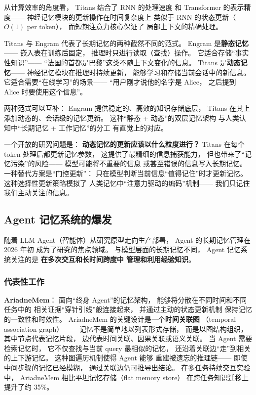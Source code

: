 从计算效率的角度看，
Titans 结合了 RNN 的处理速度
和 Transformer 的表示精度——
神经记忆模块的更新操作在时间复杂度上
类似于 RNN 的状态更新（$O(1)$ per token），
而短期注意力核心保证了
局部上下文的精确处理。

Titans 与 Engram 代表了长期记忆的两种截然不同的范式。
Engram 是\textbf{静态记忆}——
嵌入表在训练后固定，
推理时只进行读取（查找）操作。
它适合存储“事实性知识”——
“法国的首都是巴黎”这类不随上下文变化的信息。
Titans 是\textbf{动态记忆}——
神经记忆模块在推理时持续更新，
能够学习和存储当前会话中的新信息。
它适合需要“在线学习”的场景——
“用户刚才说他的名字是 Alice，
之后提到 Alice 时要使用这个信息”。

两种范式可以互补：
Engram 提供稳定的、高效的知识存储底层，
Titans 在其上添加动态的、会话级的记忆更新。
这种“静态 + 动态”的双层记忆架构
与人类认知中“长期记忆 + 工作记忆”的分工
有直觉上的对应。

一个开放的研究问题是：
\textbf{动态记忆的更新应该以什么粒度进行？}
Titans 在每个 token 处理后都更新记忆参数，
这提供了最精细的信息捕获能力，
但也带来了“记忆污染”的风险——
模型可能将不重要的信息
或甚至错误的信息写入长期记忆。
一种替代方案是“门控更新”：
只在模型判断当前信息“值得记住”时才更新记忆。
这种选择性更新策略模拟了
人类记忆中“注意力驱动的编码”机制——
我们只记住我们主动关注的信息。

\subsection{Agent 记忆系统的爆发}

随着 LLM Agent（智能体）从研究原型走向生产部署，
Agent 的长期记忆管理在 2026 年初
成为了研究的焦点领域。
与模型层面的长期记忆不同，
Agent 记忆系统关注的是
\textbf{在多次交互和长时间跨度中
管理和利用经验知识}。

\subsubsection{代表性工作}

\textbf{AriadneMem}：
面向“终身 Agent”的记忆架构，
能够将分散在不同时间和不同任务中的
相关证据“穿针引线”般连接起来，
并通过主动的状态更新机制
保持记忆的一致性和时效性。
AriadneMem 的关键设计是一个\textbf{时间关联图}
（temporal association graph）——
记忆不是简单地以列表形式存储，
而是以图结构组织，
其中节点代表记忆片段，
边代表时间关联、因果关联或语义关联。
当 Agent 需要检索记忆时，
它不仅查找与当前 query 最相似的记忆，
还沿着关联边“走”到相关的上下游记忆。
这种图遍历机制使得 Agent 能够
重建被遗忘的推理链——
即使中间步骤的记忆已经模糊，
通过关联边仍可推导出结论。
在多任务持续交互实验中，
AriadneMem 相比平坦记忆存储（flat memory store）
在跨任务知识迁移上提升了约 35\%。

